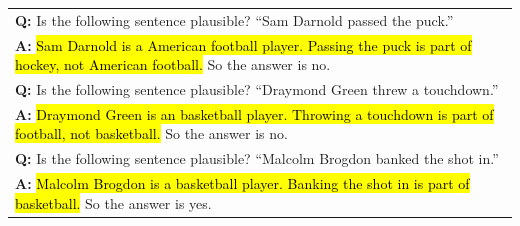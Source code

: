 \begin{table}[H]
\begin{tabular}{p{\linewidth}}
        \vspace{0mm}
        \textbf{Q:} Is the following sentence plausible? ``Sam Darnold passed the puck.'' \\
        \vspace{-1mm}
        \textbf{A:} \hl{Sam Darnold is a American football player. Passing the puck is part of hockey, not American football.} So the answer is no. \\
        \vspace{0mm}
        \textbf{Q:} Is the following sentence plausible? ``Draymond Green threw a touchdown.'' \\
        \vspace{-1mm}
        \textbf{A:} \hl{Draymond Green is an basketball player. Throwing a touchdown is part of football, not basketball.} So the answer is no. \\
        \vspace{0mm}
        \textbf{Q:} Is the following sentence plausible? ``Malcolm Brogdon banked the shot in.'' \\
        \vspace{-1mm}
        \textbf{A:} \hl{Malcolm Brogdon is a basketball player. Banking the shot in is part of basketball.} So the answer is yes. \\
        \bottomrule
    \end{tabular}
    \label{tab:appendix-sports-understanding-prompt}
\end{table}
\endgroup
